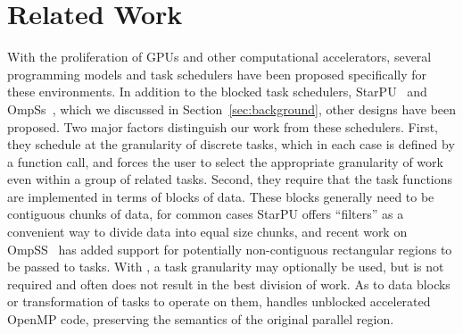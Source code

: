 \section{Related Work}
\label{sec:related}


With the proliferation of GPUs and other computational accelerators, several
programming models and task schedulers have been proposed specifically for
these environments.  In addition to the blocked task schedulers,
StarPU~\cite{Augonnet:2009uc,AugThiNamWac10RR7240} and
OmpSs~\cite{DURAN:2011uy,Bueno:2012ka}, which we discussed in
Section~\ref{sec:background}, other designs have been proposed.  Two  major
factors distinguish our work from these schedulers.  First, they schedule at
the granularity of discrete tasks, which in each case is defined by a function
call, and forces the user to select the appropriate granularity of work even
within a group of related tasks. Second, they require that the task functions
are implemented in terms of blocks of data.  These blocks generally need to be
contiguous chunks of data, for common cases StarPU offers ``filters'' as a
convenient way to divide data into equal size chunks, and recent work on
OmpSS~\cite{Bueno:2013jd} has added support for potentially non-contiguous
rectangular regions to be passed to tasks.  With \tsar, a task granularity may
optionally be used, but is not required and often does not result in the best
division of work. As to data blocks or transformation of tasks to operate on
them, \tsar handles unblocked accelerated OpenMP code, preserving the
semantics of the original parallel region.


